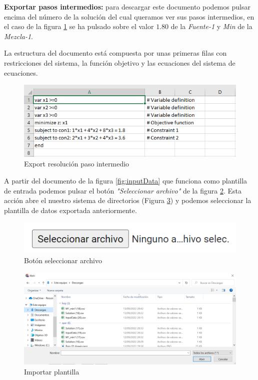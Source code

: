 \textbf{Exportar pasos intermedios:} para descargar este documento podemos pulsar encima del número de la solución del cual queramos ver sus pasos intermedios, en el caso de la figura \ref{fig:pasoIntermedio} se ha pulsado sobre el valor $1.80$ de la \textit{Fuente-1} y \textit{Min} de la \textit{Mezcla-1}.

La estructura del documento está compuesta por unas primeras filas con restricciones del sistema, la función objetivo y las ecuaciones del sistema de ecuaciones.

\begin{figure}[h!] 
\centering
    \includegraphics[width=1\textwidth]{img/pasoIntermedio.PNG}
\caption{Export resolución paso intermedio}
\label{fig:pasoIntermedio}
\end{figure}

A partir del documento de la figura \ref{fig:inputData} que funciona como plantilla de entrada podemos pulsar el botón \textit{"Seleccionar archivo"} de la figura \ref{fig:selectFile}. Esta acción abre el nuestro sistema de directorios (Figura \ref{fig:importPlant}) y podemos seleccionar la plantilla de datos exportada anteriormente. 

\begin{figure}[h!] 
\centering
    \includegraphics[width=1\textwidth]{img/selectFile.PNG}
\caption{Botón seleccionar archivo}
\label{fig:selectFile}
\end{figure}

\begin{figure}[h!] 
\centering
    \includegraphics[width=1\textwidth]{img/directoryInport.PNG}
\caption{Importar plantilla}
\label{fig:importPlant}
\end{figure}

